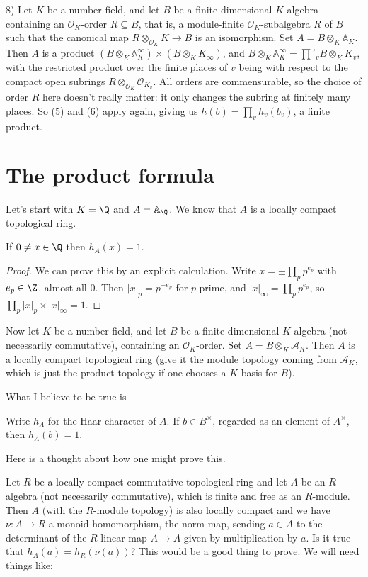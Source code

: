 8) Let $K$ be a number field, and let $B$ be a finite-dimensional $K$-algebra containing
an $\mathcal{O}_K$-order $R\subseteq B$, that is, a module-finite $\mathcal{O}_K$-subalgebra
$R$ of $B$ such that the canonical map $R\otimes_{\mathcal{O}_K}K\to B$ is an isomorphism.
Set $A=B\otimes_K\mathbb{A}_K$. Then $A$ is a product
$(B\otimes_K\mathbb{A}_K^\infty)\times(B\otimes_KK_\infty)$, and
$B\otimes_K\mathbb{A}_K^\infty=\prod'_vB\otimes_KK_v$, with the restricted product over
the finite places of $v$ being with respect to the compact open subrings
$R\otimes_{\mathcal{O}_K}\mathcal{O}_{K_v}$. All orders are commensurable, so the choice
of order $R$ here doesn't really matter: it only changes the subring at finitely many places.
So (5) and (6) apply again, giving us $h(b)=\prod_v h_v(b_v)$, a finite product.

\section{The product formula}

Let's start with $K=\Q$ and $A=\mathbb{A}_{\Q}$. We know that $A$ is a locally compact topological
ring.

\begin{lemma} If $0\not=x\in\Q$ then $h_A(x)=1.$
\end{lemma}
\begin{proof} We can prove this by an explicit calculation. Write $x=\pm\prod_p p^{e_p}$
  with $e_p\in\Z$, almost all $0$. Then $|x|_p=p^{-e_p}$ for $p$ prime, and
  $|x|_\infty=\prod_p p^{e_p}$, so $\prod_p|x|_p\times|x|_\infty=1$.
\end{proof}

Now let $K$ be a number field, and let $B$ be a finite-dimensional $K$-algebra (not necessarily
commutative), containing an $\mathcal{O}_K$-order. Set $A=B\otimes_K\mathcal{A}_K$.
Then $A$ is a locally compact topological ring (give it the module topology coming from
$\mathcal{A}_K$, which is just the product topology if one chooses a $K$-basis for $B$).

What I believe to be true is

\begin{theorem} Write $h_A$ for the Haar character of $A$.
  If $b\in B^\times$, regarded as an element of $A^\times$, then $h_A(b)=1.$
\end{theorem}

Here is a thought about how one might prove this.

Let $R$ be a locally compact commutative topological
ring and let $A$ be an $R$-algebra (not necessarily commutative), which is finite
and free as an $R$-module. Then $A$ (with the $R$-module topology) is also locally compact
and we have $\nu:A\to R$ a monoid homomorphism, the norm map, sending $a\in A$ to the
determinant of the $R$-linear map $A\to A$ given by multiplication by $a$. Is it
true that $h_A(a)=h_R(\nu(a))$? This would be a good thing to prove. We will need things like:

